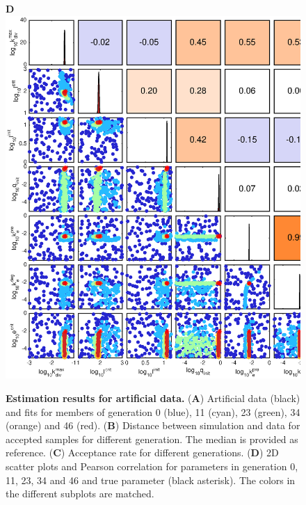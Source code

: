 \documentclass[10pt,letterpaper]{article}
\begin{document}
\begin{figure}[p]
\begin{adjustwidth}{-2in}{0in}
\begin{center}
\begin{minipage}[t]{0.45\textwidth}
\end{minipage}
\begin{minipage}[t]{0.85\textwidth}
	\textbf{D}\\ \includegraphics[width=\textwidth]{Data/TumorToyData2D_0.001merr_100pop_GCKI67ECM-scatterPlotMatrix}
\end{minipage}
\end{center}
\vspace*{0.5cm}
\caption{{\bf Estimation results for artificial data.}
(\textbf{A}) Artificial data (black) and fits for members of generation 0 (blue), 11 (cyan), 23 (green), 34 (orange) and 46 (red).
(\textbf{B}) Distance between simulation and data for accepted samples for different generation. The median is provided as reference. 
(\textbf{C}) Acceptance rate for different generations.
(\textbf{D}) 2D scatter plots and Pearson correlation for parameters in generation 0, 11, 23, 34 and 46 and true parameter (black asterisk). 
The colors in the different subplots are matched.
}
\label{fig: inference using 2D model}
\end{adjustwidth}
\end{figure}
\end{document}
